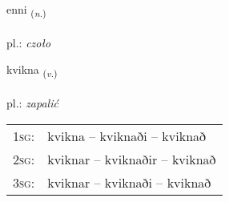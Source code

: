 \documentclass[frontgrid, backgrid]{flacards}\usepackage[]{graphicx}\usepackage[]{xcolor}
\begin{document}
\renewcommand{\flhead}{\vskip5pt \fboxsep=0pt {\small\bfseries\footnotesize Nafnorð | rzeczownik}}
\renewcommand{\fcfoot}{\vskip5pt \fboxsep=0pt \hspace{2pt}{\small\bfseries\footnotesize 3K}}

\renewcommand{\blhead}{\vskip5pt {\small\bfseries\footnotesize Nafnorð | rzeczownik }}
\renewcommand{\bcfoot}{\vskip5pt \hspace{2pt}{\small\bfseries\footnotesize 3K}}


{enni \small{\textsubscript{(\textit{n.})}} \\[1ex] %
\textphonetic{[ɛnɪ]} \\
pl.: \emph{czoło} \\  [2ex]
\renewcommand*{\arraystretch}{0.8}
}

\renewcommand{\flhead}{\vskip5pt \fboxsep=0pt {\small\bfseries\footnotesize Sagnorð | czasownik}}
\renewcommand{\fcfoot}{\vskip5pt \fboxsep=0pt \hspace{2pt}{\small\bfseries\footnotesize 3K}}

\renewcommand{\blhead}{\vskip5pt {\small\bfseries\footnotesize Sagnorð | czasownik }}
\renewcommand{\bcfoot}{\vskip5pt \hspace{2pt}{\small\bfseries\footnotesize 3K}}


{kvikna \small{\textsubscript{(\textit{v.})}} \\[1ex] %
\textphonetic{[kʰvɪhkna]} \\
pl.: \emph{zapalić} \\  [2ex]
\renewcommand*{\arraystretch}{0.8}
\begin{tabular}{p{1cm}l}
\textsc{1sg}: & kvikna -- kviknaði -- kviknað \\ 
\textsc{2sg}: & kviknar -- kviknaðir -- kviknað \\ 
\textsc{3sg}: & kviknar -- kviknaði -- kviknað \\ 
\end{tabular}
}
\end{document}
